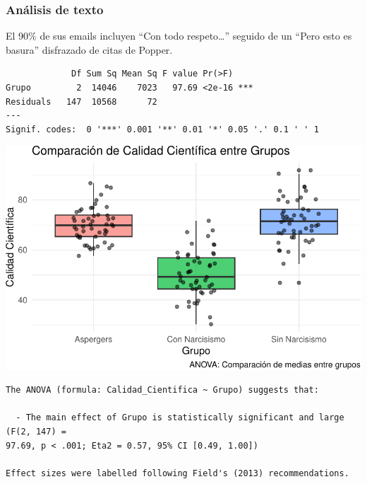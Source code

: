 \documentclass[
]{article}
\begin{document}
\subsubsection{Análisis de texto}\label{anuxe1lisis-de-texto}

El 90\% de sus emails incluyen ``Con todo respeto\ldots{}'' seguido de
un ``Pero esto es basura'' disfrazado de citas de Popper.

\begin{verbatim}
             Df Sum Sq Mean Sq F value Pr(>F)    
Grupo         2  14046    7023   97.69 <2e-16 ***
Residuals   147  10568      72                   
---
Signif. codes:  0 '***' 0.001 '**' 0.01 '*' 0.05 '.' 0.1 ' ' 1
\end{verbatim}

\includegraphics{template_files/figure-pdf/unnamed-chunk-6-1.pdf}

\begin{tcolorbox}[enhanced jigsaw, leftrule=.75mm, toprule=.15mm, colbacktitle=quarto-callout-tip-color!10!white, arc=.35mm, titlerule=0mm, coltitle=black, breakable, toptitle=1mm, bottomtitle=1mm, left=2mm, title=\textcolor{quarto-callout-tip-color}{\faLightbulb}\hspace{0.5em}{Tip}, colframe=quarto-callout-tip-color-frame, rightrule=.15mm, bottomrule=.15mm, opacitybacktitle=0.6, opacityback=0, colback=white]

\begin{verbatim}
The ANOVA (formula: Calidad_Cientifica ~ Grupo) suggests that:

  - The main effect of Grupo is statistically significant and large (F(2, 147) =
97.69, p < .001; Eta2 = 0.57, 95% CI [0.49, 1.00])

Effect sizes were labelled following Field's (2013) recommendations.
\end{verbatim}

\end{tcolorbox}
\end{document}
